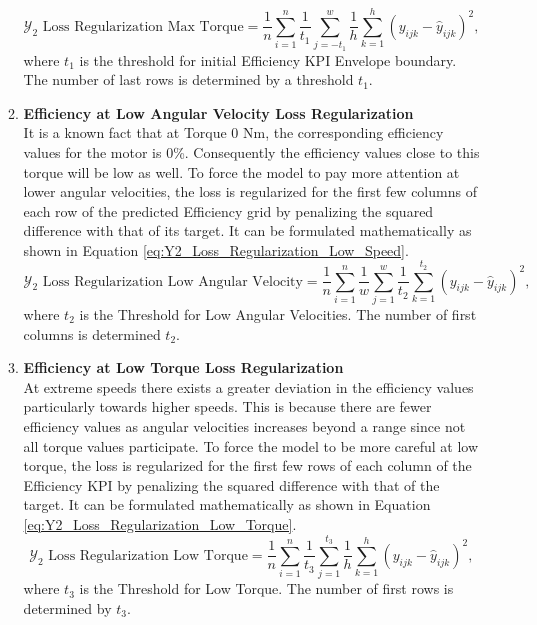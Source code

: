 \documentclass{report} %
\begin{document}
\begin{enumerate}
\begin{enumerate}
\begin{equation}
    \text{$\mathcal{Y}_2$ Loss Regularization Max Torque} = \frac{1}{n} \sum_{i=1}^{n} \frac{1}{t_{1}} \sum_{j=-t_{1}}^{w} \frac{1}{h} \sum_{k=1}^{h} (y_{ijk} - \hat{y}_{ijk})^2,
    \label{eq:Y2_Loss_Regularization_MM_Max_Torque}
\end{equation}
where \(t_{1}\) is the threshold for initial Efficiency \ac{KPI} Envelope boundary. The number of last rows is determined by a threshold $t_{1}$.\\
\item \textbf{Efficiency at Low Angular Velocity Loss Regularization} \\
It is a known fact that at Torque 0 Nm, the corresponding efficiency values for the motor is 0\%. Consequently the efficiency values close to this torque will be low as well.
To force the model to pay more attention at lower angular velocities, the loss is regularized for the first few columns of each row of the predicted Efficiency grid 
by penalizing the squared difference with that of its target. It can be formulated mathematically as shown in Equation \ref{eq:Y2_Loss_Regularization_Low_Speed}.
\begin{equation}
    \text{$\mathcal{Y}_2$ Loss Regularization Low Angular Velocity} = \frac{1}{n} \sum_{i=1}^{n} \frac{1}{w} \sum_{j=1}^{w} \frac{1}{t_{2}} \sum_{k=1}^{t_{2}} (y_{ijk} - \hat{y}_{ijk})^2,
    \label{eq:Y2_Loss_Regularization_Low_Speed}
\end{equation}
where \(t_{2}\) is the Threshold for Low Angular Velocities. The number of first columns is determined $t_{2}$. \\
\item \textbf{Efficiency at Low Torque Loss Regularization} \\
At extreme speeds there exists a greater deviation in the efficiency values particularly towards higher speeds. This is because there are fewer efficiency values as angular velocities 
increases beyond a range since not all torque values participate.
To force the model to be more careful at low torque, the loss is regularized for the first few rows of each column of the Efficiency \ac{KPI} by penalizing the 
squared difference with that of the target. 
It can be formulated mathematically as shown in Equation \ref{eq:Y2_Loss_Regularization_Low_Torque}.
\begin{equation}
    \text{$\mathcal{Y}_2$ Loss Regularization Low Torque} = \frac{1}{n} \sum_{i=1}^{n} \frac{1}{t_{3}} \sum_{j=1}^{t_{3}} \frac{1}{h} \sum_{k=1}^{h} (y_{ijk} - \hat{y}_{ijk})^2,
    \label{eq:Y2_Loss_Regularization_Low_Torque}
\end{equation}
where \(t_{3}\) is the Threshold for Low Torque. The number of first rows is determined by $t_{3}$.\\


\end{enumerate}
\end{enumerate}
\end{document}
